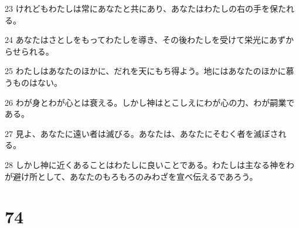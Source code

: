 \par 23 けれどもわたしは常にあなたと共にあり、あなたはわたしの右の手を保たれる。
\par 24 あなたはさとしをもってわたしを導き、その後わたしを受けて栄光にあずからせられる。
\par 25 わたしはあなたのほかに、だれを天にもち得よう。地にはあなたのほかに慕うものはない。
\par 26 わが身とわが心とは衰える。しかし神はとこしえにわが心の力、わが嗣業である。
\par 27 見よ、あなたに遠い者は滅びる。あなたは、あなたにそむく者を滅ぼされる。
\par 28 しかし神に近くあることはわたしに良いことである。わたしは主なる神をわが避け所として、あなたのもろもろのみわざを宣べ伝えるであろう。

\chapter{74}

